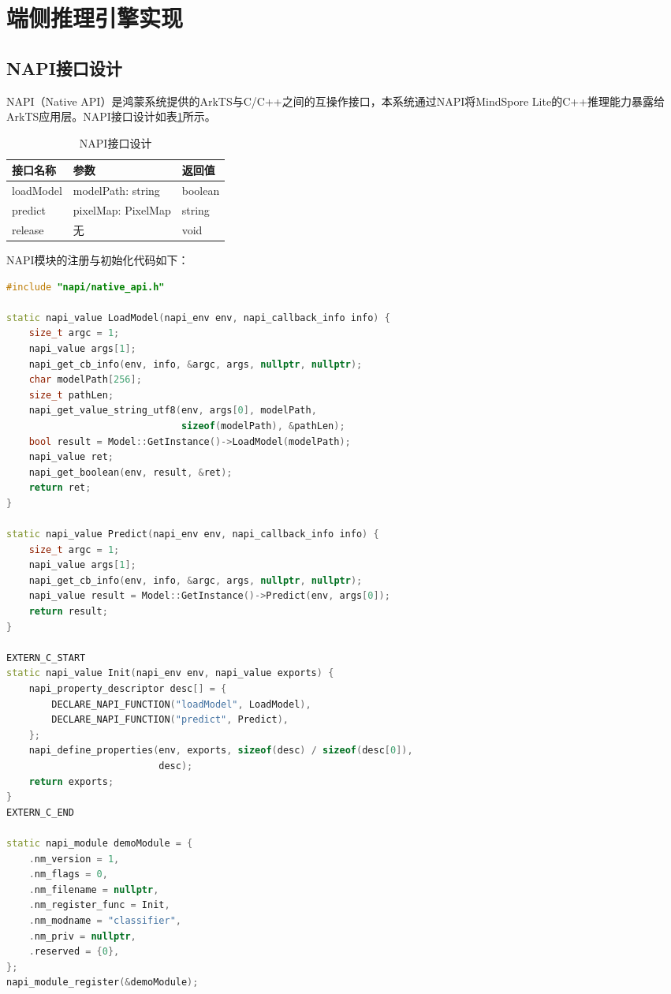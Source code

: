 \section{端侧推理引擎实现}

\subsection{NAPI接口设计}

NAPI（Native API）是鸿蒙系统提供的ArkTS与C/C++之间的互操作接口，本系统通过NAPI将MindSpore Lite的C++推理能力暴露给ArkTS应用层。NAPI接口设计如表\ref{tab:napi}所示。

\begin{table}[htbp]
	\centering
	\caption{NAPI接口设计}
	\label{tab:napi}
	\begin{tabular}{lll}
		\toprule
		接口名称 & 参数 & 返回值 \\
		\midrule
		loadModel & modelPath: string & boolean \\
		predict & pixelMap: PixelMap & string \\
		release & 无 & void \\
		\bottomrule
	\end{tabular}
\end{table}

NAPI模块的注册与初始化代码如下：

\begin{lstlisting}[language=C++, caption={NAPI模块注册}]
#include "napi/native_api.h"

static napi_value LoadModel(napi_env env, napi_callback_info info) {
    size_t argc = 1;
    napi_value args[1];
    napi_get_cb_info(env, info, &argc, args, nullptr, nullptr);
    char modelPath[256];
    size_t pathLen;
    napi_get_value_string_utf8(env, args[0], modelPath,
                               sizeof(modelPath), &pathLen);
    bool result = Model::GetInstance()->LoadModel(modelPath);
    napi_value ret;
    napi_get_boolean(env, result, &ret);
    return ret;
}

static napi_value Predict(napi_env env, napi_callback_info info) {
    size_t argc = 1;
    napi_value args[1];
    napi_get_cb_info(env, info, &argc, args, nullptr, nullptr);
    napi_value result = Model::GetInstance()->Predict(env, args[0]);
    return result;
}

EXTERN_C_START
static napi_value Init(napi_env env, napi_value exports) {
    napi_property_descriptor desc[] = {
        DECLARE_NAPI_FUNCTION("loadModel", LoadModel),
        DECLARE_NAPI_FUNCTION("predict", Predict),
    };
    napi_define_properties(env, exports, sizeof(desc) / sizeof(desc[0]),
                           desc);
    return exports;
}
EXTERN_C_END

static napi_module demoModule = {
    .nm_version = 1,
    .nm_flags = 0,
    .nm_filename = nullptr,
    .nm_register_func = Init,
    .nm_modname = "classifier",
    .nm_priv = nullptr,
    .reserved = {0},
};
napi_module_register(&demoModule);
\end{lstlisting}

